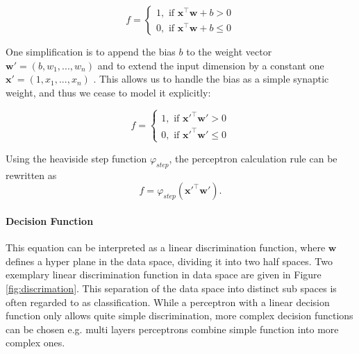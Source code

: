 \[
	f = 
		\begin{cases}
			1, \text{  if  } \textbf{x}^\intercal \textbf{w} + b > 0  \\
			0, \text{  if  } \textbf{x}^\intercal \textbf{w} + b \le 0
		\end{cases}	
\]

One simplification is to append the bias $b$ to the weight vector $\textbf{w}' = (b , w_1, ... , w_n)$ and to extend the input dimension by a constant one $\textbf{x}' = (1, x_1 , ... , x_n)$ .
This allows us to handle the bias as a simple synaptic weight, and thus we cease to model it explicitly:

\[
	f = 
		\begin{cases}
			1, \text{  if  } \textbf{x}'^\intercal \textbf{w}'> 0  \\
			0, \text{  if  } \textbf{x}'^\intercal \textbf{w}' \le 0
		\end{cases}	
\]



Using the heaviside step function $\varphi_{step}$, the perceptron calculation rule can be rewritten as 
\[
	f = \varphi_{step}(\textbf{x}'^\intercal \textbf{w}') .
\]   

\paragraph{Decision Function} \label{c:perdecision}

This equation can be interpreted as a linear discrimination function, where $\textbf{w}$ defines a hyper plane in the data space, dividing it into two half spaces. 
Two exemplary linear discrimination function in data space are given in Figure \ref{fig:discrimation}.
This separation of the data space into distinct sub spaces is often regarded to as classification. 
While a perceptron with a linear decision function only allows quite simple discrimination, more complex decision functions can be chosen e.g. multi layers perceptrons combine simple function into more complex ones. 

